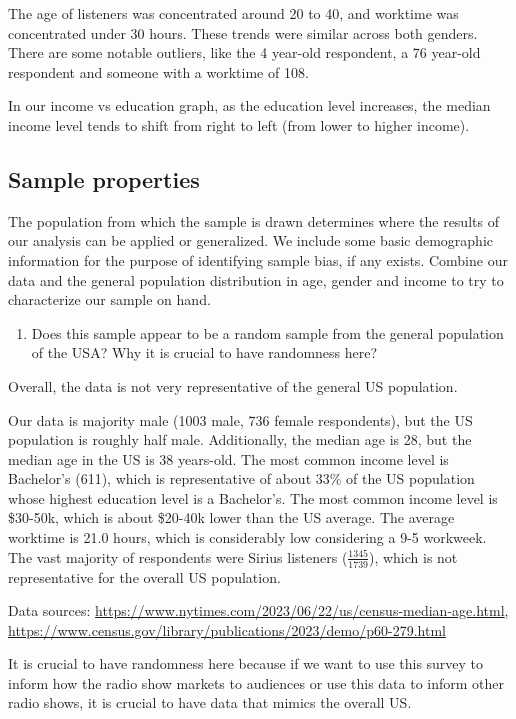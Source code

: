 \documentclass[
]{article}
\providecommand{\tightlist}{%
  \setlength{\itemsep}{0pt}\setlength{\parskip}{0pt}}
\begin{document}
The age of listeners was concentrated around 20 to 40, and worktime was
concentrated under 30 hours. These trends were similar across both
genders. There are some notable outliers, like the 4 year-old
respondent, a 76 year-old respondent and someone with a worktime of 108.

In our income vs education graph, as the education level increases, the
median income level tends to shift from right to left (from lower to
higher income).

\hypertarget{sample-properties}{%
\subsection{Sample properties}\label{sample-properties}}

The population from which the sample is drawn determines where the
results of our analysis can be applied or generalized. We include some
basic demographic information for the purpose of identifying sample
bias, if any exists. Combine our data and the general population
distribution in age, gender and income to try to characterize our sample
on hand.

\begin{enumerate}
\def\labelenumi{\arabic{enumi}.}
\tightlist
\item
  Does this sample appear to be a random sample from the general
  population of the USA? Why it is crucial to have randomness here?
\end{enumerate}

Overall, the data is not very representative of the general US
population.

Our data is majority male (1003 male, 736 female respondents), but the
US population is roughly half male. Additionally, the median age is 28,
but the median age in the US is 38 years-old. The most common income
level is Bachelor's (611), which is representative of about 33\% of the
US population whose highest education level is a Bachelor's. The most
common income level is \$30-50k, which is about \$20-40k lower than the
US average. The average worktime is 21.0 hours, which is considerably
low considering a 9-5 workweek. The vast majority of respondents were
Sirius listeners (\(\frac{1345}{1739}\)), which is not representative
for the overall US population.

Data sources:
\url{https://www.nytimes.com/2023/06/22/us/census-median-age.html},
\url{https://www.census.gov/library/publications/2023/demo/p60-279.html}

It is crucial to have randomness here because if we want to use this
survey to inform how the radio show markets to audiences or use this
data to inform other radio shows, it is crucial to have data that mimics
the overall US.
\end{document}
